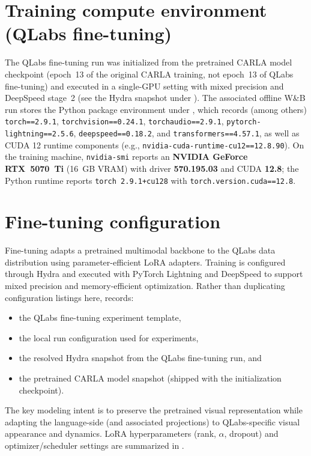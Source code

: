 \section{Training compute environment (QLabs fine-tuning)}
\label{sec:training-env}
The QLabs fine-tuning run was initialized from the pretrained CARLA model checkpoint  (epoch~13 of the original CARLA training, not epoch~13 of QLabs fine-tuning) and executed in a single-GPU setting with mixed precision and DeepSpeed stage~2 (see the Hydra snapshot under ). The associated offline W\&B run stores the Python package environment under , which records (among others) \texttt{torch==2.9.1}, \texttt{torchvision==0.24.1}, \texttt{torchaudio==2.9.1}, \texttt{pytorch-lightning==2.5.6}, \texttt{deepspeed==0.18.2}, and \texttt{transformers==4.57.1}, as well as CUDA 12 runtime components (e.g., \texttt{nvidia-cuda-runtime-cu12==12.8.90}). On the training machine, \texttt{nvidia-smi} reports an \textbf{NVIDIA GeForce RTX~5070~Ti} (16~GB VRAM) with driver \textbf{570.195.03} and CUDA \textbf{12.8}; the Python runtime reports \texttt{torch 2.9.1+cu128} with \texttt{torch.version.cuda==12.8}.

\section{Fine-tuning configuration}
\label{sec:finetune-config}
Fine-tuning adapts a pretrained multimodal backbone to the QLabs data distribution using parameter-efficient LoRA adapters. Training is configured through Hydra and executed with PyTorch Lightning and DeepSpeed to support mixed precision and memory-efficient optimization. Rather than duplicating configuration listings here,  records:
\begin{itemize}[leftmargin=*,itemsep=0.25em]
  \item the QLabs fine-tuning experiment template,
  \item the local run configuration used for experiments,
  \item the resolved Hydra snapshot from the QLabs fine-tuning run, and
  \item the pretrained CARLA model snapshot (shipped with the initialization checkpoint).
\end{itemize}

The key modeling intent is to preserve the pretrained visual representation while adapting the language-side (and associated projections) to QLabs-specific visual appearance and dynamics. LoRA hyperparameters (rank, $\alpha$, dropout) and optimizer/scheduler settings are summarized in .
